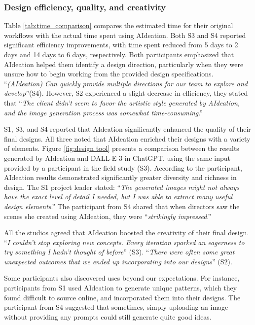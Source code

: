 \subsubsection{Design efficiency, quality, and creativity}
Table \ref{tab:time_comparison} compares the estimated time for their original workflows with the actual time spent using AIdeation. Both S3 and S4 reported significant efficiency improvements, with time spent reduced from 5 days to 2 days and 14 days to 6 days, respectively. Both participants emphasized that AIdeation helped them identify a design direction, particularly when they were unsure how to begin working from the provided design specifications. “\textit{(AIdeation) Can quickly provide multiple directions for our team to explore and develop}”(S4). However, S2 experienced a slight decrease in efficiency, they stated that “\textit{The client didn't seem to favor the artistic style generated by AIdeation, and the image generation process was somewhat time-consuming}.”

S1, S3, and S4 reported that AIdeation significantly enhanced the quality of their final designs. All three noted that AIdeation enriched their designs with a variety of elements. Figure \ref{fig:design tool} presents a comparison between the results generated by AIdeation and DALL-E 3 in ChatGPT, using the same input provided by a participant in the field study (S3). According to the participant, AIdeation results demonstrated significantly greater diversity and richness in design. The S1 project leader stated: “\textit{The generated images might not always have the exact level of detail I needed, but I was able to extract many useful design elements}.” The participant from S4 shared that when directors saw the scenes she created using AIdeation, they were “\textit{strikingly impressed}.”

All the studios agreed that AIdeation boosted the creativity of their final design. “\textit{I couldn’t stop exploring new concepts. Every iteration sparked an eagerness to try something I hadn’t thought of before}” (S3). “\textit{There were often some great unexpected outcomes that we ended up incorporating into our designs}” (S2).

Some participants also discovered uses beyond our expectations. For instance, participants from S1 used AIdeation to generate unique patterns, which they found difficult to source online, and incorporated them into their designs. The participant from S4 suggested that sometimes, simply uploading an image without providing any prompts could still generate quite good ideas.

